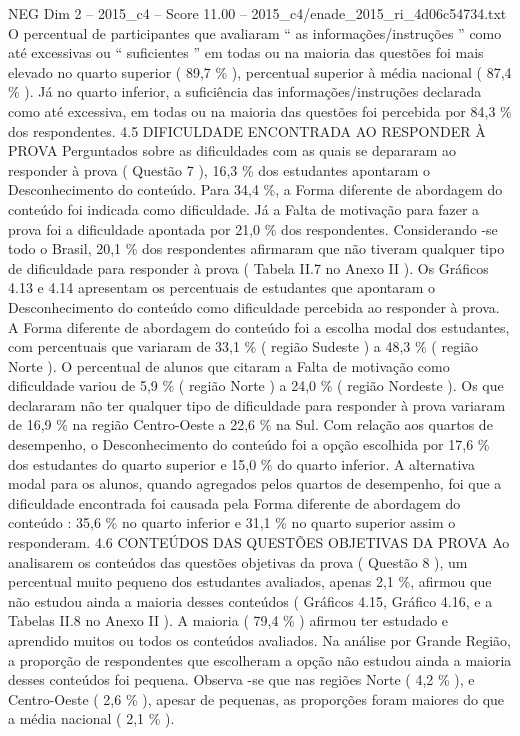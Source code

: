 \begin{textsample}{NEG Dim 2 – 2015\_c4 – Score 11.00 – 2015\_c4/enade\_2015\_ri\_4d06c54734.txt}
O percentual de participantes que avaliaram “ as informações/instruções ” como até excessivas ou “ suficientes ” em todas ou na maioria das questões foi mais elevado no quarto superior ( 89,7 \% ), percentual superior à média nacional ( 87,4 \% ).
Já no quarto inferior, a suficiência das informações/instruções declarada como até excessiva, em todas ou na maioria das questões foi percebida por 84,3 \% dos respondentes. 4.5 DIFICULDADE ENCONTRADA AO RESPONDER À PROVA Perguntados sobre as dificuldades com as quais se depararam ao responder à prova ( Questão 7 ), 16,3 \% dos estudantes apontaram o Desconhecimento do conteúdo.
Para 34,4 \%, a Forma diferente de abordagem do conteúdo foi indicada como dificuldade.
Já a Falta de motivação para fazer a prova foi a dificuldade apontada por 21,0 \% dos respondentes.
Considerando -se todo o Brasil, 20,1 \% dos respondentes afirmaram que não tiveram qualquer tipo de dificuldade para responder à prova ( Tabela II.7 no Anexo II ).
Os Gráficos 4.13 e 4.14 apresentam os percentuais de estudantes que apontaram o Desconhecimento do conteúdo como dificuldade percebida ao responder à prova.
A Forma diferente de abordagem do conteúdo foi a escolha modal dos estudantes, com percentuais que variaram de 33,1 \% ( região Sudeste ) a 48,3 \% ( região Norte ).
O percentual de alunos que citaram a Falta de motivação como dificuldade variou de 5,9 \% ( região Norte ) a 24,0 \% ( região Nordeste ).
Os que declararam não ter qualquer tipo de dificuldade para responder à prova variaram de 16,9 \% na região Centro-Oeste a 22,6 \% na Sul.
Com relação aos quartos de desempenho, o Desconhecimento do conteúdo foi a opção escolhida por 17,6 \% dos estudantes do quarto superior e 15,0 \% do quarto inferior.
A alternativa modal para os alunos, quando agregados pelos quartos de desempenho, foi que a dificuldade encontrada foi causada pela Forma diferente de abordagem do conteúdo : 35,6 \% no quarto inferior e 31,1 \% no quarto superior assim o responderam. 4.6 CONTEÚDOS DAS QUESTÕES OBJETIVAS DA PROVA Ao analisarem os conteúdos das questões objetivas da prova ( Questão 8 ), um percentual muito pequeno dos estudantes avaliados, apenas 2,1 \%, afirmou que não estudou ainda a maioria desses conteúdos ( Gráficos 4.15, Gráfico 4.16, e a Tabelas II.8 no Anexo II ).
A maioria ( 79,4 \% ) afirmou ter estudado e aprendido muitos ou todos os conteúdos avaliados.
Na análise por Grande Região, a proporção de respondentes que escolheram a opção não estudou ainda a maioria desses conteúdos foi pequena.
Observa -se que nas regiões Norte ( 4,2 \% ), e Centro-Oeste ( 2,6 \% ), apesar de pequenas, as proporções foram maiores do que a média nacional ( 2,1 \% ).

\end{textsample}
